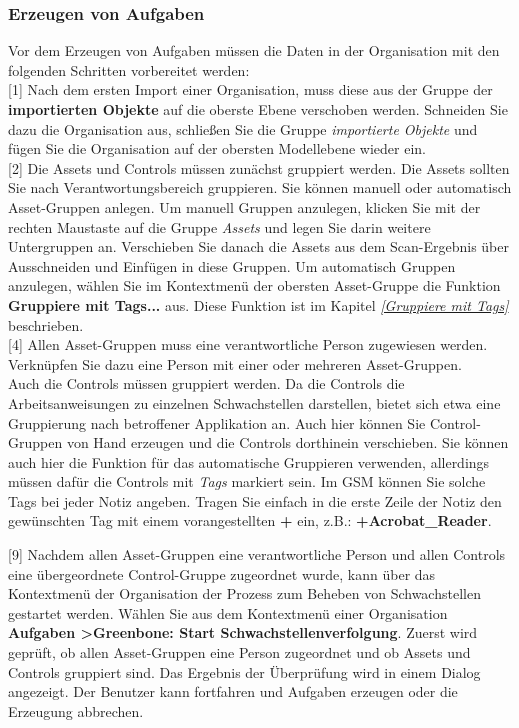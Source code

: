 \documentclass[a4paper,10pt]{book}
\begin{document}
\subsubsection{Erzeugen von Aufgaben}
Vor dem Erzeugen von Aufgaben müssen die Daten in der Organisation mit den folgenden Schritten vorbereitet werden:
\newline\\
{[}1{]} Nach dem ersten Import einer Organisation, muss diese aus der Gruppe der \textbf{importierten Objekte} auf die oberste
Ebene verschoben werden. Schneiden Sie dazu die Organisation aus, schließen Sie die Gruppe {\em importierte Objekte} und fügen Sie die Organisation auf der obersten Modellebene wieder ein.
\newline\\
{[}2{]} Die Assets und Controls müssen zunächst gruppiert werden.
Die Assets sollten Sie nach Verantwortungsbereich gruppieren. Sie können manuell oder automatisch Asset-Gruppen anlegen. Um manuell Gruppen anzulegen, klicken Sie mit der rechten Maustaste auf die Gruppe {\em Assets} und legen Sie darin weitere Untergruppen an. Verschieben Sie danach die Assets aus dem Scan-Ergebnis über Ausschneiden und Einfügen in diese Gruppen.
Um automatisch Gruppen anzulegen, wählen Sie im Kontextmenü der obersten
Asset-Gruppe die Funktion \textbf{Gruppiere mit Tags...} aus.
Diese Funktion ist im Kapitel {\em \ref{Gruppiere mit Tags} } beschrieben.
\newline\\
{[}4{]} Allen Asset-Gruppen muss eine verantwortliche Person zugewiesen werden. Verknüpfen Sie dazu eine Person mit einer oder mehreren Asset-Gruppen.
\newline\\
Auch die Controls müssen gruppiert werden. Da die Controls die Arbeitsanweisungen zu einzelnen Schwachstellen darstellen, bietet sich etwa eine Gruppierung nach betroffener Applikation an. Auch hier können Sie Control-Gruppen von Hand erzeugen und die Controls dorthinein verschieben. Sie können auch hier die Funktion für das automatische Gruppieren verwenden, allerdings müssen dafür die Controls mit {\em Tags} markiert sein. Im GSM können Sie solche Tags bei jeder Notiz angeben. Tragen Sie einfach in die erste Zeile der Notiz den gewünschten Tag mit einem vorangestellten \textbf{+} ein, z.B.: \textbf{+Acrobat\_Reader}.

{[}9{]} Nachdem allen Asset-Gruppen eine verantwortliche Person und allen Controls eine übergeordnete Control-Gruppe zugeordnet wurde, kann über das Kontextmenü der Organisation
der Prozess zum Beheben von Schwachstellen gestartet werden. Wählen Sie aus dem Kontextmenü einer Organisation \textbf{Aufgaben \textgreater Greenbone: Start Schwachstellenverfolgung}. Zuerst wird geprüft, ob allen Asset-Gruppen eine Person zugeordnet und ob Assets und Controls gruppiert sind. Das Ergebnis der Überprüfung wird in einem Dialog angezeigt. Der Benutzer kann fortfahren und Aufgaben erzeugen oder die Erzeugung abbrechen.
\end{document}
